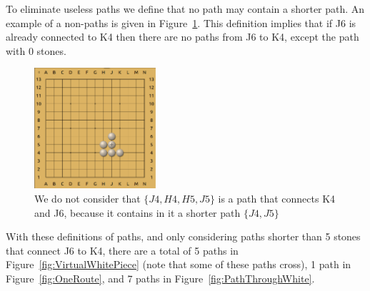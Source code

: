 \documentclass[doublespacing, 12pt, a4paper]{article}
\begin{document}
To eliminate useless paths we define that no path may contain a shorter path. An example of a non-paths is given in Figure~\ref{fig:NonPaths}.  This definition implies that if J6 is already connected to K4 then there are no paths from J6 to K4, except the path with $0$ stones.
\begin{figure}
\centering
\includegraphics[width=0.4\textwidth]{NonPath1}
\caption{We do not consider that $\{J4,H4,H5,J5\}$ is a path that connects K4 and J6, because it contains in it a shorter path $\{J4,J5\}$  }
\label{fig:NonPaths}
\end{figure}

With these definitions of paths, and only considering paths shorter than 5 stones that connect J6 to K4, there are a total of 5 paths in Figure~\ref{fig:VirtualWhitePiece} (note that some of these paths cross), 1 path in Figure~\ref{fig:OneRoute}, and 7 paths in Figure~\ref{fig:PathThroughWhite}.
\end{document}
